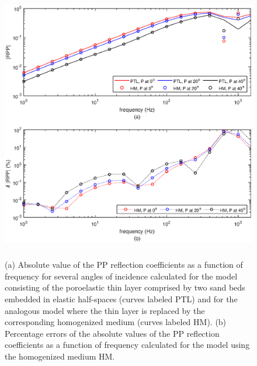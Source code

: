 \documentclass[draft]{agujournal2019}
\begin{document}
\begin{figure}[!ht]
\centering
        \includegraphics[width= 120mm, height=120mm]{rppbg_2sandshaleUL12.eps}
\caption{ (a) Absolute value of the PP reflection coefficients as a function of frequency for several angles of incidence calculated for the model consisting of the poroelastic thin layer comprised by two sand beds embedded in elastic half-spaces (curves labeled PTL) and for the analogous model where the thin layer is replaced by the corresponding homogenized medium (curves labeled HM).  (b) Percentage errors of the absolute values of the PP reflection coefficients as a function of frequency calculated for the model using the homogenized medium HM.}
\label{fig.3}
\end{figure}
\end{document}
